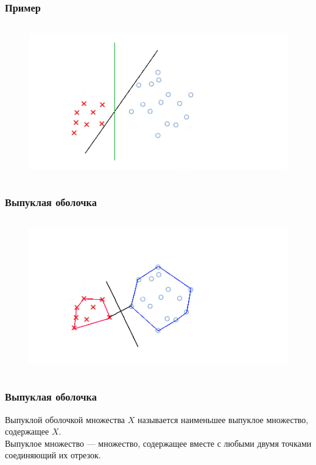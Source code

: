 \documentclass[12pt]{beamer}
\begin{document}
\begin{frame}\frametitle{Пример}
\begin{figure}[htbp]
  \includegraphics[height=190pt, keepaspectratio = true]{images/example}   
\end{figure}
\end{frame}


\begin{frame}\frametitle{Выпуклая оболочка}
\begin{figure}[htbp]
  \includegraphics[height=190pt, keepaspectratio = true]{images/example1}   
\end{figure}
\end{frame}

\begin{frame}\frametitle{Выпуклая оболочка}
Выпуклой оболочкой множества $X$ называется наименьшее выпуклое множество, содержащее $X$.\\
\vspace{5mm}
Выпуклое множество — множество, содержащее вместе с любыми двумя точками соединяющий их отрезок.
\end{frame}
\end{document}

